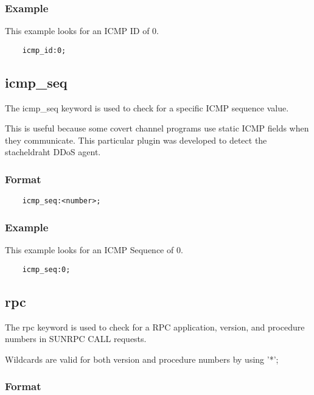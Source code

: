 \documentclass[english]{report}
\begin{document}
\subsubsection{Example}

This example looks for an ICMP ID of 0.

\begin{verbatim}
    icmp_id:0;
\end{verbatim}

\subsection{icmp\_seq}

The icmp\_seq keyword is used to check for a specific ICMP sequence value.

This is useful because some covert channel programs use static ICMP fields when
they communicate.  This particular plugin was developed to detect the
stacheldraht DDoS agent.

\subsubsection{Format}

\begin{verbatim}
    icmp_seq:<number>;
\end{verbatim}

\subsubsection{Example}

This example looks for an ICMP Sequence of 0.

\begin{verbatim}
    icmp_seq:0;
\end{verbatim}

\subsection{rpc}

The rpc keyword is used to check for a RPC application, version, and procedure
numbers in SUNRPC CALL requests.

Wildcards are valid for both version and procedure numbers by using '*';

\subsubsection{Format}
\end{document}

